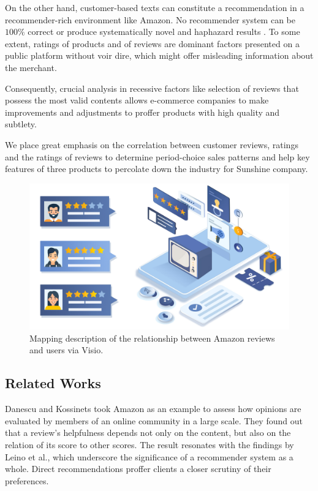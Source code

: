 \documentclass[12pt]{article}%
\begin{document}
On the other hand, customer-based texts can constitute a recommendation in a recommender-rich environment like Amazon. No recommender system can be $100\%$ correct or produce systematically novel and haphazard results\cite{bib:1, bib:2} . To some extent, ratings of products and of reviews are dominant factors presented on a public platform without voir dire, which might offer misleading information about the merchant.

 Consequently, crucial analysis in recessive factors like selection of reviews that possess the most valid contents allows e-commerce companies to make improvements and adjustments to proffer products with high quality and subtlety\cite{amsu}.
 
We place great emphasis on the correlation between customer reviews, ratings and the ratings of reviews to determine period-choice sales patterns and help key features of three products to percolate down the industry for Sunshine company.


\begin{figure}[H]
	\centering
	\includegraphics[width=.7\textwidth]{pic/protect.jpg}%
	\caption{Mapping description of the relationship between Amazon reviews and users via Visio.}\label{Suzanne}%
\end{figure}



\subsection{Related Works}

Danescu and Kossinets \cite{232}took Amazon as an example to assess how opinions are evaluated by members of an online community in a large scale. They found out that a review’s helpfulness depends not only on the content, but also on the relation of its score to other scores. The result resonates with the findings by Leino et al.\cite{236}, which underscore the significance of a recommender system as a whole. Direct recommendations proffer clients a closer scrutiny of their preferences.
\end{document}
